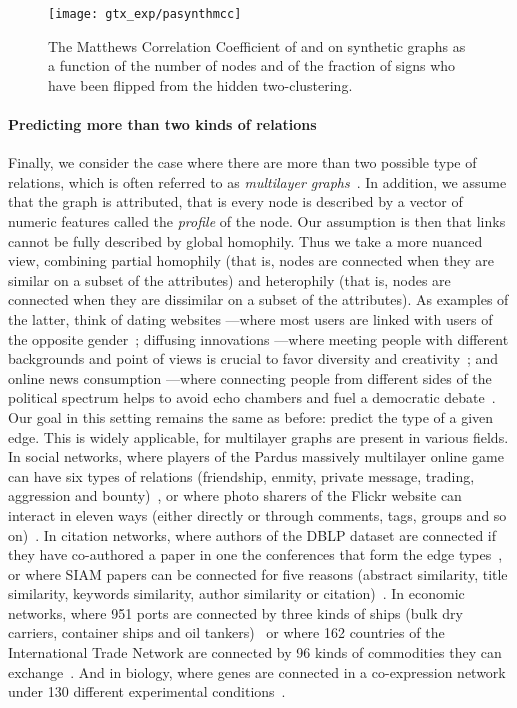 \begin{figure}[phtb]
  \centering
  \texttt{[image: gtx\_exp/pasynthmcc]}
  \caption{The Matthews Correlation Coefficient of \bfs{} and \gtx{} on synthetic \lpa{} graphs as a
    function of the number of nodes and of the fraction of signs who have been flipped from the
    hidden two-clustering.  \label{fig:gtx_xp_pasynthmcc}}
\end{figure}
\fi

\vspace{-\baselineskip}
\paragraph{Predicting more than two kinds of relations}

Finally, we consider the case where there are more than two possible type of relations, which is
often referred to as \emph{multilayer graphs}~\autocites{Kivela2014}{multiSurvey14}. In addition, we assume
that the graph is attributed, that is every node is described by a vector of numeric features called
the \emph{profile} of the node. Our assumption is then that links cannot be fully described by
global homophily. Thus we take a more nuanced view, combining partial homophily (that is, nodes are
connected when they are similar on a subset of the attributes) and heterophily (that is, nodes are
connected when they are dissimilar on a subset of the attributes). As examples of the latter, think
of dating websites ---where most users are linked with users of the opposite
gender~\autocites{homophilyMyspace09}{Tinder16}; diffusing innovations ---where meeting people with
different backgrounds and point of views is crucial to favor diversity and
creativity~\autocite{rogers2003diffusion}; and online news consumption ---where connecting people
from different sides of the political spectrum helps to avoid echo chambers and fuel a democratic
debate~\autocite{balancedNews17}. Our goal in this setting remains the same as before: predict the
type of a given edge. This is
widely applicable, for multilayer graphs are present  in various fields. In social networks, where
players of the Pardus massively multilayer online game can have six types of relations (friendship,
enmity, private message, trading, aggression and bounty)~\autocite{Szell2010}, or where photo sharers
of the Flickr website can interact in eleven ways (either directly or through comments, tags, groups
and so on)~\autocite{RecoFlickrMulti11}. In citation networks, where authors of the DBLP dataset are
connected if they have co-authored a paper in one the  conferences that form the edge
types~\autocite{communityDBLPbyConf05}, or where  SIAM papers can be connected for five
reasons (abstract similarity, title similarity, keywords similarity, author similarity or
citation)~\autocite{articlesMultiSim11}. In economic networks, where 951 ports are connected by three
kinds of ships (bulk dry carriers, container ships and oil tankers)~\autocite{ports3kindofships10} or
where 162 countries of the International Trade Network are connected by 96 kinds of commodities they
can exchange~\autocite{worldTradeNetwork10}. And in biology, where genes are connected in a
co-expression network under 130 different experimental conditions~\autocite{bioLayerExp11}.

